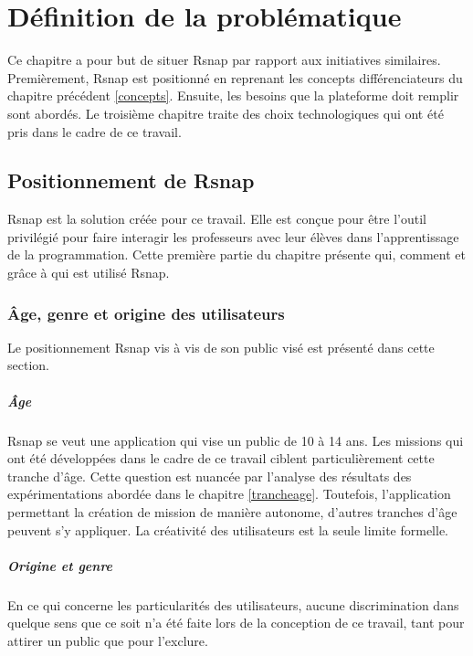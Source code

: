 \chapter{Définition de la problématique}
Ce chapitre a pour but de situer \gls{Rsnap} par rapport aux initiatives similaires. Premièrement, \gls{Rsnap} est positionné en reprenant les concepts différenciateurs du chapitre précédent \ref{concepts}. Ensuite, les besoins que la plateforme doit remplir sont abordés. Le troisième chapitre traite des choix technologiques qui ont été pris dans le cadre de ce travail.

\section{Positionnement de \gls{Rsnap}}
\label{positionnement}
\gls{Rsnap} est la solution créée pour ce travail. Elle est conçue pour être l'outil privilégié pour faire interagir les professeurs avec leur élèves dans l'apprentissage de la programmation.
Cette première partie du chapitre présente qui, comment et grâce à qui est utilisé \gls{Rsnap}.

\subsection{Âge, genre et origine des utilisateurs}
Le positionnement \gls{Rsnap} vis à vis de son public visé est présenté dans cette section.

\paragraph{Âge}
\gls{Rsnap} se veut une application qui vise un public de 10 à 14 ans. Les missions qui ont été développées dans le cadre de ce travail ciblent particulièrement cette tranche d'âge. Cette question est nuancée par l'analyse des résultats des expérimentations abordée dans le chapitre \ref{trancheage}.
Toutefois, l'application permettant la création de mission de manière autonome, d'autres tranches d'âge peuvent s'y appliquer. La créativité des utilisateurs est la seule limite formelle.

\paragraph{Origine et genre}
En ce qui concerne les particularités des utilisateurs, aucune discrimination dans quelque sens que ce soit n'a été faite lors de la conception de ce travail, tant pour attirer un public que pour l'exclure.

